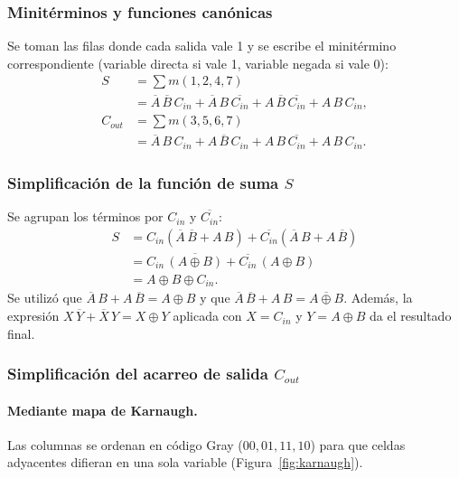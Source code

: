 \documentclass[10pt]{article}
\begin{document}
\subsubsection{Minitérminos y funciones canónicas}

Se toman las filas donde cada salida vale 1 y se escribe el minitérmino
correspondiente (variable directa si vale 1, variable negada si vale 0):
\begin{align}
  S &= \sum m(1,2,4,7) \nonumber \\
    &= \overline{A}\,\overline{B}\,C_{in} + \overline{A}\,B\,\overline{C_{in}}
       + A\,\overline{B}\,\overline{C_{in}} + A\,B\,C_{in}, \\[4pt]
  C_{out} &= \sum m(3,5,6,7) \nonumber \\
    &= \overline{A}\,B\,C_{in} + A\,\overline{B}\,C_{in}
       + A\,B\,\overline{C_{in}} + A\,B\,C_{in}.
\end{align}

\subsubsection{Simplificación de la función de suma $S$}

Se agrupan los términos por $C_{in}$ y $\overline{C_{in}}$:
\begin{align}
  S &= C_{in}\left(\overline{A}\,\overline{B} + A\,B\right)
       + \overline{C_{in}}\left(\overline{A}\,B + A\,\overline{B}\right) \nonumber \\
    &= C_{in}\,\overline{(A \oplus B)} + \overline{C_{in}}\,(A \oplus B)
       \nonumber \\
    &= A \oplus B \oplus C_{in}.
\end{align}
Se utilizó que $\overline{A}\,B + A\,\overline{B} = A \oplus B$ y que
$\overline{A}\,\overline{B} + A\,B = \overline{A \oplus B}$. Además, la
expresión $X\,\overline{Y}+\overline{X}\,Y = X\oplus Y$ aplicada con
$X = C_{in}$ y $Y = A\oplus B$ da el resultado final.

\subsubsection{Simplificación del acarreo de salida $C_{out}$}

\paragraph{Mediante mapa de Karnaugh.} Las columnas se ordenan en código Gray
($00, 01, 11, 10$) para que celdas adyacentes difieran en una sola variable
(Figura~\ref{fig:karnaugh}).
\end{document}
